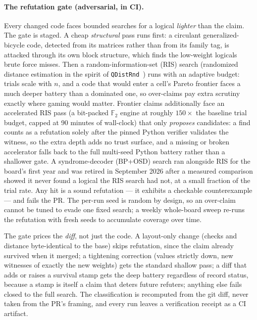 \documentclass[11pt]{article}
\newcommand{\GF}{\mathbb{F}_2}
\begin{document}
	\paragraph{The refutation gate (adversarial, in CI).} Every changed code
	faces bounded searches for a logical \emph{lighter} than the claim. The
	gate is staged. A cheap \emph{structural} pass runs first: a circulant
	generalized-bicycle code, detected from its matrices rather than from
	its family tag, is attacked through its own block structure, which finds
	the low-weight logicals brute force misses. Then a random-information-set
	(RIS) search (randomized distance estimation in the spirit of
	\texttt{QDistRnd}~\cite{pryadko2023qdistrnd}) runs with an adaptive
	budget: trials scale with $n$, and a code that would enter a cell's
	Pareto frontier faces a much deeper battery than a dominated one, so
	over-claims pay extra scrutiny exactly where gaming would matter.
	Frontier claims additionally face an accelerated RIS pass (a bit-packed
	$\GF$ engine at roughly $150\times$ the baseline trial budget, capped at
	90 minutes of wall-clock) that only \emph{proposes} candidates: a find
	counts as a refutation solely after the pinned Python verifier validates
	the witness, so the extra depth adds no trust surface, and a missing or
	broken accelerator falls back to the full multi-seed Python battery
	rather than a shallower gate. A syndrome-decoder (BP+OSD) search ran
	alongside RIS for the board's first year and was retired in September
	2026 after a measured comparison showed it never found a logical the RIS
	search had not, at a small fraction of the trial rate. Any hit is a sound
	refutation --- it exhibits a checkable counterexample --- and fails the
	PR. The per-run seed is random by design, so an over-claim cannot be
	tuned to evade one fixed search; a weekly whole-board sweep re-runs the
	refutation with fresh seeds to accumulate coverage over time.

	The gate prices the \emph{diff}, not just the code. A layout-only change
	(checks and distance byte-identical to the base) skips refutation, since
	the claim already survived when it merged; a tightening correction
	(values strictly down, new witnesses of exactly the new weights) gets
	the standard shallow pass; a diff that adds or raises a survival stamp
	gets the deep battery regardless of record status, because a stamp is
	itself a claim that deters future refuters; anything else fails closed to
	the full search. The classification is recomputed from the git diff,
	never taken from the PR's framing, and every run leaves a verification
	receipt as a CI artifact.
\end{document}

